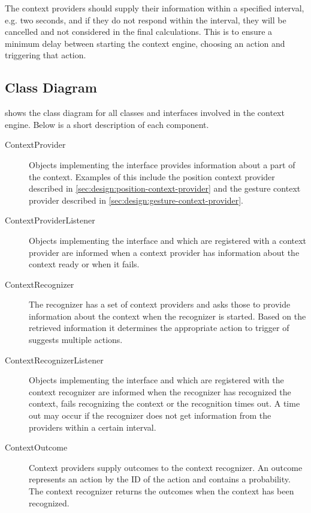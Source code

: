 The context providers should supply their information within a specified interval, e.g. two seconds, and if they do not respond within the interval, they will be cancelled and not considered in the final calculations. This is to ensure a minimum delay between starting the context engine, choosing an action and triggering that action.

\subsection{Class Diagram}
\label{sec:design:context-engine:class-diagram}

 shows the class diagram for all classes and interfaces involved in the context engine. Below is a short description of each component.

\begin{description}
\item[ContextProvider] Objects implementing the interface provides information about a part of the context. Examples of this include the position context provider described in \cref{sec:design:position-context-provider} and the gesture context provider described in \cref{sec:design:gesture-context-provider}.
\item[ContextProviderListener] Objects implementing the interface and which are registered with a context provider are informed when a context provider has information about the context ready or when it fails.
\item[ContextRecognizer] The recognizer has a set of context providers and asks those to provide information about the context when the recognizer is started. Based on the retrieved information it determines the appropriate action to trigger of suggests multiple actions.
\item[ContextRecognizerListener] Objects implementing the interface and which are registered with the context recognizer are informed when the recognizer has recognized the context, fails recognizing the context or the recognition times out. A time out may occur if the recognizer does not get information from the providers within a certain interval.
\item[ContextOutcome] Context providers supply outcomes to the context recognizer. An outcome represents an action by the ID of the action and contains a probability. The context recognizer returns the outcomes when the context has been recognized.
\end{description}

